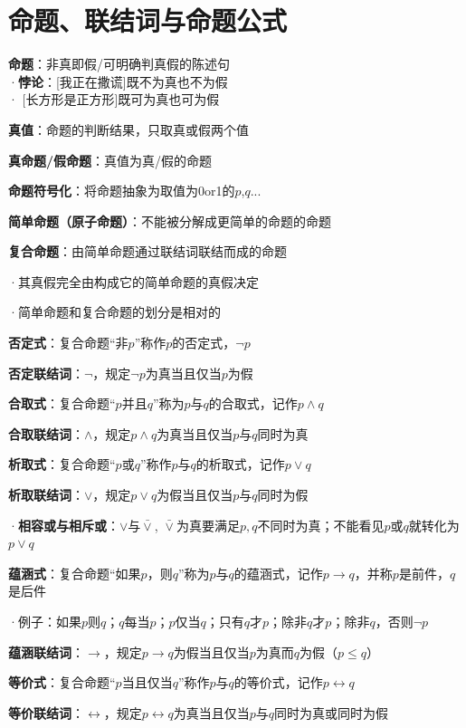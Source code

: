 \section*{命题、联结词与命题公式}

\textbf{命题}：非真即假/可明确判真假的陈述句\\
·\textbf{悖论}：[我正在撒谎]既不为真也不为假\\
· [长方形是正方形]既可为真也可为假

\textbf{真值}：命题的判断结果，只取真或假两个值

\textbf{真命题/假命题}：真值为真/假的命题

\textbf{命题符号化}：将命题抽象为取值为0or1的$p$,$q$...

\textbf{简单命题（原子命题）}：不能被分解成更简单的命题的命题

\textbf{复合命题}：由简单命题通过联结词联结而成的命题

·其真假完全由构成它的简单命题的真假决定

·简单命题和复合命题的划分是相对的

\textbf{否定式}：复合命题“非$p$”称作$p$的否定式，$\neg p$

\textbf{否定联结词}：$\neg$，规定$\neg p$为真当且仅当$p$为假

\textbf{合取式}：复合命题“$p$并且$q$”称为$p$与$q$的合取式，记作$p \wedge q$

\textbf{合取联结词}：$\wedge$，规定$p \wedge q$为真当且仅当$p$与$q$同时为真

\textbf{析取式}：复合命题“$p$或$q$”称作$p$与$q$的析取式，记作$p \vee q$

\textbf{析取联结词}：$\vee$，规定$p \vee q$为假当且仅当$p$与$q$同时为假

·\textbf{相容或与相斥或}：$\vee$与$\bar{\vee}$, $\bar{\vee}$为真要满足$p, q$不同时为真；不能看见$p$或$q$就转化为$p \vee q$

\textbf{蕴涵式}：复合命题“如果$p$，则$q$”称为$p$与$q$的蕴涵式，记作$p \rightarrow q$，并称$p$是前件，$q$是后件

·例子：如果$p$则$q$；$q$每当$p$；$p$仅当$q$；只有$q$才$p$；除非$q$才$p$；除非$q$，否则$\lnot p$

\textbf{蕴涵联结词}：$\rightarrow$，规定$p \rightarrow q$为假当且仅当$p$为真而$q$为假（$p \le q$）

\textbf{等价式}：复合命题“$p$当且仅当$q$”称作$p$与$q$的等价式，记作$p \leftrightarrow q$

\textbf{等价联结词}：$\leftrightarrow$，规定$p \leftrightarrow q$为真当且仅当$p$与$q$同时为真或同时为假

